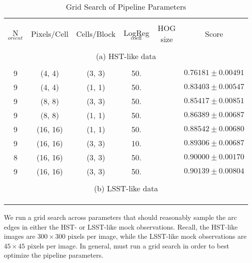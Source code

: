 \documentclass{emulateapj}
\begin{document}
\begin{table}
\caption{Grid Search of Pipeline Parameters}
\begin{center}
\begin{tabular}{cccccc}
\hline \\ [-0.2cm]
N$_{orient}$ & Pixels/Cell & Cells/Block & LogReg$_{\text{coeff}}$ & HOG size & Score \\ [0.2cm]
\hline \\ [-0.2cm]
\multicolumn{6}{c}{(a) HST-like data} \\ [0.2cm]
\hline \\ [-0.2cm]
9 & (4, 4) & (3, 3) & 50. & &$0.76181\pm0.00491$\\ [0.2cm]
9 & (4, 4) & (1, 1) & 50. & &$0.83403\pm0.00547$\\ [0.2cm]
9 & (8, 8) & (3, 3) & 50. & &$0.85417\pm0.00851$\\ [0.2cm] 
9 & (8, 8) & (1, 1) & 50. & &$0.86389\pm0.00687$\\ [0.2cm] 
9 & (16, 16) & (1, 1) & 50. & & $0.88542\pm0.00680$ \\ [0.2cm]
9 & (16, 16) & (3, 3) & 10. & &$0.89306\pm0.00687$ \\ [0.2cm]
8 & (16, 16) & (3, 3) & 50. & &$0.90000\pm0.00170$ \\ [0.2cm]
9 & (16, 16) & (3, 3) & 50. & &$0.90139\pm0.00804$ \\ [0.2cm]
\hline \\ [-0.2cm]
\multicolumn{6}{c}{(b) LSST-like data} \\ [0.2cm]
\hline \\ [-0.2cm]
& & & & &\\
& & & & &\\ [0.2cm]
\hline
\end{tabular}
\end{center}
\label{tab:gridsearch}
\end{table}

We run a grid search across parameters that should reasonably sample
the arc edges in either the HST- or LSST-like mock observations.
Recall, the HST-like images are $300\times300$ pixels per image, while
the LSST-like mock observations are $45\times45$ pixels per image.  In
general, must run a grid search in order to best optimize the pipeline
parameters.
\end{document}
